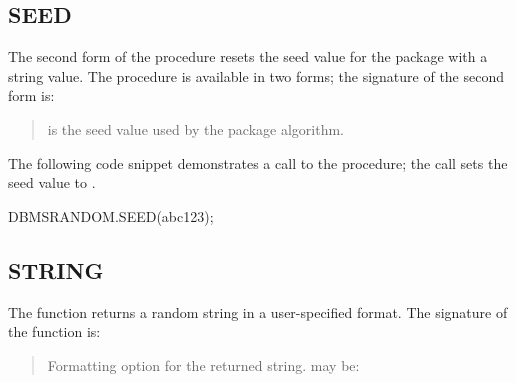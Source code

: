 \documentclass[letterpaper,10pt,english,openany,oneside]{sphinxmanual}
\begin{document}
\subsection{SEED}
\label{\detokenize{dbms_random:id1}}
The second form of the  procedure resets the seed value for the
 package with a string value. The  procedure is
available in two forms; the signature of the second form is:



\begin{quote}

 is the seed value used by the  package algorithm.
\end{quote}


The following code snippet demonstrates a call to the  procedure;
the call sets the seed value to .

%
\begin{sphinxVerbatim}[commandchars=\\\{\}]
DBMS\PYGZus{}RANDOM.SEED(\PYGZsq{}abc123\PYGZsq{});
\end{sphinxVerbatim}


\subsection{STRING}
\label{\detokenize{dbms_random:string}}
The  function returns a random  string in a user-specified
format. The signature of the  function is:
\begin{quote}

\end{quote}


\begin{quote}

Formatting option for the returned string.  may be:
\end{quote}
\end{document}
